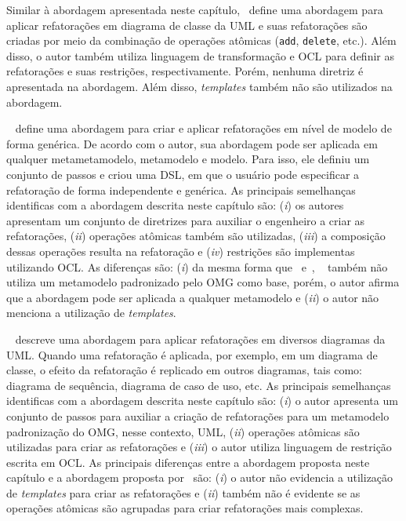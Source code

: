 Similar à abordagem apresentada neste capítulo,~ define uma abordagem para aplicar refatorações em diagrama de classe da UML e suas refatorações são criadas por meio da combinação de operações atômicas (\texttt{add}, \texttt{delete}, etc.). Além disso, o autor também utiliza linguagem de transformação e OCL para definir as refatorações e suas restrições, respectivamente. Porém, nenhuma diretriz é apresentada na abordagem. Além disso, \textit{templates} também não são utilizados na abordagem. 

~ define uma abordagem para criar e aplicar refatorações em nível de modelo de forma genérica. De acordo com o autor, sua abordagem pode ser aplicada em qualquer metametamodelo, metamodelo e modelo. Para isso, ele definiu um conjunto de passos e criou uma DSL, em que o usuário pode especificar a refatoração de forma independente e genérica. As principais semelhanças identificas com a abordagem descrita neste capítulo são: (\textit{i}) os autores apresentam um conjunto de diretrizes para auxiliar o engenheiro a criar as refatorações, (\textit{ii}) operações atômicas também são utilizadas, (\textit{iii}) a composição dessas operações resulta na refatoração e (\textit{iv}) restrições são implementas utilizando OCL. As diferenças são: (\textit{i}) da mesma forma que~ e~,  ~ também não utiliza um metamodelo padronizado pelo OMG como base, porém, o autor afirma que a abordagem pode ser aplicada a qualquer metamodelo e (\textit{ii}) o autor não menciona a utilização de \textit{templates}.

~ descreve uma abordagem para aplicar refatorações em diversos diagramas da UML. Quando uma refatoração é aplicada, por exemplo, em um diagrama de classe, o efeito da refatoração é replicado em outros diagramas, tais como: diagrama de sequência, diagrama de caso de uso, etc. As principais semelhanças identificas com a abordagem descrita neste capítulo são: (\textit{i}) o autor apresenta um conjunto de passos para auxiliar a criação de refatorações para um metamodelo padronização do OMG, nesse contexto, UML, (\textit{ii}) operações atômicas são utilizadas para criar as refatorações e (\textit{iii}) o autor utiliza linguagem de restrição escrita em OCL. As principais diferenças entre a abordagem proposta neste capítulo e a abordagem proposta por~ são: (\textit{i}) o autor não evidencia a utilização de \textit{templates} para criar as refatorações e (\textit{ii}) também não é evidente se as operações atômicas são agrupadas para criar refatorações mais complexas. 

